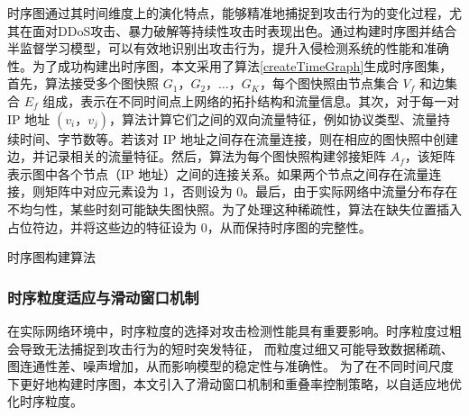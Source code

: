 \documentclass[promaster]{thesis-uestc}
\begin{document}
时序图通过其时间维度上的演化特点，能够精准地捕捉到攻击行为的变化过程，尤其在面对DDoS攻击、暴力破解等持续性攻击时表现出色。通过构建时序图并结合半监督学习模型，可以有效地识别出攻击行为，提升入侵检测系统的性能和准确性。为了成功构建出时序图，本文采用了算法\ref{createTimeGraph}生成时序图集，首先，算法接受多个图快照 $G_1， G_2， \dots， G_K$，每个图快照由节点集合 $V_f$ 和边集合 $E_f$ 组成，表示在不同时间点上网络的拓扑结构和流量信息。其次，对于每一对 IP 地址 $(v_i， v_j)$，算法计算它们之间的双向流量特征，例如协议类型、流量持续时间、字节数等。若该对 IP 地址之间存在流量连接，则在相应的图快照中创建边，并记录相关的流量特征。然后，算法为每个图快照构建邻接矩阵 $A_f$，该矩阵表示图中各个节点（IP 地址）之间的连接关系。如果两个节点之间存在流量连接，则矩阵中对应元素设为 1，否则设为 0。最后，由于实际网络中流量分布存在不均匀性，某些时刻可能缺失图快照。为了处理这种稀疏性，算法在缺失位置插入占位符边，并将这些边的特征设为 0，从而保持时序图的完整性。
\begin{algorithm}[h!]
\caption{时序图构建算法}
\label{createTimeGraph}
\end{algorithm}

\subsubsection{时序粒度适应与滑动窗口机制}

在实际网络环境中，时序粒度的选择对攻击检测性能具有重要影响。时序粒度过粗会导致无法捕捉到攻击行为的短时突发特征，
而粒度过细又可能导致数据稀疏、图连通性差、噪声增加，从而影响模型的稳定性与准确性。
为了在不同时间尺度下更好地构建时序图，本文引入了滑动窗口机制和重叠率控制策略，以自适应地优化时序粒度。
\end{document}
